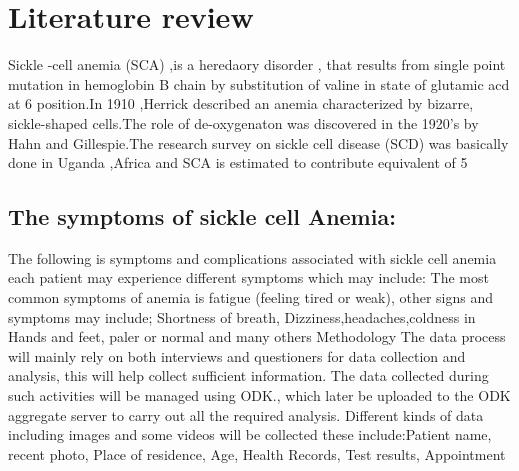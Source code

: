 \documentclass[12pt,]{article}
\begin{document}
\section{Literature review}
Sickle -cell anemia (SCA) ,is a heredaory disorder , that results from single point mutation in hemoglobin B chain by substitution of valine in state of glutamic acd at 6 position.In 1910 ,Herrick described an anemia characterized by bizarre, sickle-shaped cells.The role of de-oxygenaton was discovered in the 1920’s by Hahn and Gillespie.The research survey on sickle cell disease (SCD) was basically done in Uganda ,Africa and SCA is estimated to contribute equivalent of 5%


\subsection{The symptoms of sickle cell Anemia:}
The following is symptoms and complications associated with sickle cell anemia each patient may experience different symptoms which may include: The most common symptoms of anemia is fatigue (feeling tired or weak), other signs and symptoms may include; Shortness of breath, Dizziness,headaches,coldness in Hands and feet, paler or normal and many others
Methodology
The data process will mainly rely on both interviews and questioners for data collection and analysis, this will help collect sufficient information. The data collected during such activities will be managed using ODK., which later be uploaded to the ODK aggregate server to carry out all the required analysis. Different kinds of data including images and some videos will be collected these include:Patient name, recent photo, Place of residence, Age, Health Records, Test results, Appointment 
\end{document}
